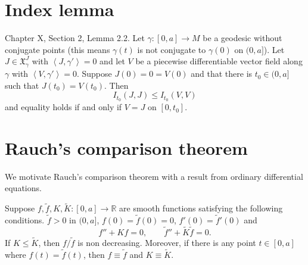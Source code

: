 \documentclass{book}
\begin{document}
\section{Index lemma}
\label{section-index-lemma}

\begin{lemma}[Index]
\label{lemma-index}
\cite{doc} Chapter X, Section 2, Lemma 2.2.
Let $\gamma:[0,a]\to M$ be a
geodesic without conjugate points (this means
$\gamma(t)$ is not conjugate to
$\gamma(0)$ on $(0,a]$). Let
$J\in\mathfrak{X}_\gamma^J$ with
$\left\langle{}J,\gamma'\right\rangle{}=0$ and let $V$ be a
piecewise differentiable vector
field along $\gamma$ with
$\left\langle{}V,\gamma'\right\rangle{}=0$. Suppose
$J(0)=0=V(0)$ and
that there is  $t_0\in(0,a]$ such that
$J(t_0)=V(t_0)$. Then
$$
I_{t_0}(J,J)\leq I_{t_0}(V,V)
$$
and equality holds if and only if $V=J$ on
$[0,t_0]$.
\end{lemma}

\section{Rauch's comparison theorem}
\label{section-Rauch}

We motivate Rauch's comparison theorem with a
result from ordinary
differential equations.

\begin{theorem}[Sturm]
\label{theorem-Sturm}
Suppose $f,\tilde{f},K,\tilde{K}:[0,a]\to
\mathbb{R}$ are smooth functions
satisfying the following conditions.
$\tilde{f} > 0$ in $(0,a]$,
$f(0)=\tilde{f}(0)=0$,
$f'(0)=\tilde{f}'(0)$ and
$$
f''+Kf=0,\qquad
\tilde{f}''+\tilde{K}\tilde{f}=0.
$$
If $K\leq \tilde{K}$, then $f/\tilde{f}$ is
non decreasing. Moreover, if there
is any point $t \in [0,a]$ where
$f(t)=\tilde{f}(t)$, then $f \equiv
\tilde{f}$
and $K \equiv \tilde{K}$.
\end{theorem}
\end{document}
